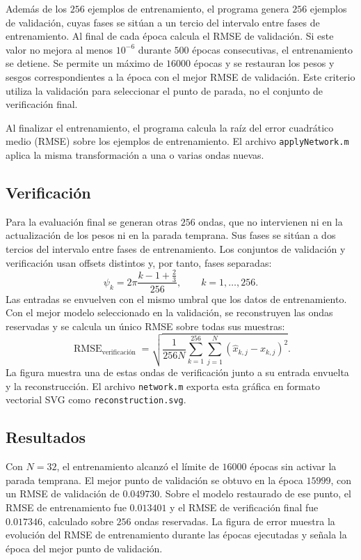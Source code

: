 \documentclass[12pt,a4paper]{article}
\begin{document}
Además de los \(256\) ejemplos de entrenamiento, el programa genera \(256\) ejemplos de validación, cuyas fases se sitúan a un tercio del intervalo entre fases de entrenamiento. Al final de cada época calcula el RMSE de validación. Si este valor no mejora al menos \(10^{-6}\) durante \(500\) épocas consecutivas, el entrenamiento se detiene. Se permite un máximo de \(16000\) épocas y se restauran los pesos y sesgos correspondientes a la época con el mejor RMSE de validación. Este criterio utiliza la validación para seleccionar el punto de parada, no el conjunto de verificación final.

Al finalizar el entrenamiento, el programa calcula la raíz del error cuadrático medio (RMSE) sobre los ejemplos de entrenamiento. El archivo \texttt{applyNetwork.m} aplica la misma transformación a una o varias ondas nuevas.

\subsection{Verificación}

Para la evaluación final se generan otras \(256\) ondas, que no intervienen ni en la actualización de los pesos ni en la parada temprana. Sus fases se sitúan a dos tercios del intervalo entre fases de entrenamiento. Los conjuntos de validación y verificación usan offsets distintos y, por tanto, fases separadas:
\begin{equation*}
  \psi_k=2\pi\frac{k-1+\frac{2}{3}}{256},
  \qquad k=1,\ldots,256.
\end{equation*}
Las entradas se envuelven con el mismo umbral que los datos de entrenamiento. Con el mejor modelo seleccionado en la validación, se reconstruyen las ondas reservadas y se calcula un único RMSE sobre todas sus muestras:
\begin{equation*}
  \operatorname{RMSE}_{\mathrm{verificación}}
  =\sqrt{\frac{1}{256N}\sum_{k=1}^{256}\sum_{j=1}^{N}
    (\widehat{x}_{k,j}-x_{k,j})^2}.
\end{equation*}
La figura muestra una de estas ondas de verificación junto a su entrada envuelta y la reconstrucción. El archivo \texttt{network.m} exporta esta gráfica en formato vectorial SVG como \texttt{reconstruction.svg}.

\subsection{Resultados}

Con \(N=32\), el entrenamiento alcanzó el límite de \(16000\) épocas sin activar la parada temprana. El mejor punto de validación se obtuvo en la época \(15999\), con un RMSE de validación de \(0.049730\). Sobre el modelo restaurado de ese punto, el RMSE de entrenamiento fue \(0.013401\) y el RMSE de verificación final fue \(0.017346\), calculado sobre \(256\) ondas reservadas. La figura de error muestra la evolución del RMSE de entrenamiento durante las épocas ejecutadas y señala la época del mejor punto de validación.
\end{document}
